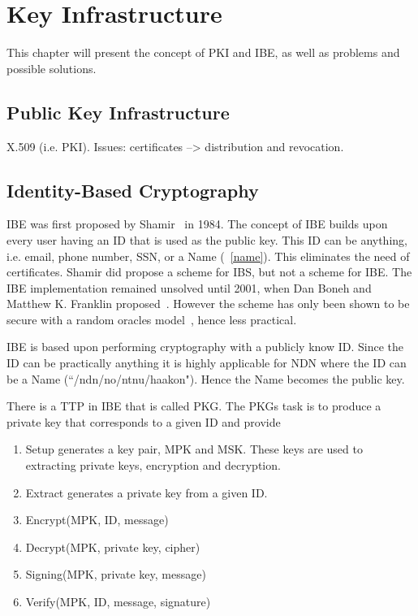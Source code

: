 \chapter{Key Infrastructure}
This chapter will present the concept of \gls{PKI} and \gls{IBE}, as well as problems and possible solutions. 

\section{Public Key Infrastructure}

X.509 (i.e. \gls{PKI}). Issues: certificates --> distribution and revocation.

\section{Identity-Based Cryptography}\label{ibc}
\gls{IBE} was first proposed by Shamir~\cite{DBLP:conf/crypto/Shamir84} in 1984. 
The concept of \gls{IBE} builds upon every user having an \gls{ID} that is used as the public key. 
This \gls{ID} can be anything, i.e. email, phone number, \gls{SSN}, or a Name (~\autoref{name}).
This eliminates the need of certificates.
Shamir did propose a scheme for \gls{IBS}, but not a scheme for \gls{IBE}. 
The \gls{IBE} implementation remained unsolved until 2001, when Dan Boneh and Matthew K. Franklin proposed~\cite{DBLP:conf/crypto/BonehF01}.
However the scheme has only been shown to be secure with a random oracles model~\cite{DBLP:journals/iacr/Waters04}, hence less practical.


\gls{IBE} is based upon performing cryptography with a publicly know \gls{ID}.
Since the \gls{ID} can be practically anything it is highly applicable for \gls{NDN} where the \gls{ID} can be a Name (``/ndn/no/ntnu/haakon").
Hence the Name becomes the public key. 

There is a \gls{TTP} in \gls{IBE} that is called \gls{PKG}.
The \gls{PKG}s task is to produce a private key that corresponds to a given ID and provide 

\begin{enumerate}
  \item Setup generates a key pair, \gls{MPK} and \gls{MSK}. These keys are used to extracting private keys, encryption and decryption.
  \item Extract generates a private key from a given ID. 
  \item Encrypt(\gls{MPK}, ID, message)
  \item Decrypt(\gls{MPK}, private key, cipher)
  \item Signing(\gls{MPK}, private key, message)
  \item Verify(\gls{MPK}, ID, message, signature)
\end{enumerate}

